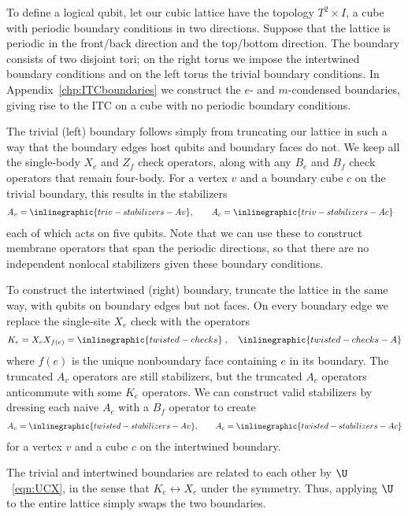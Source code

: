To define a logical qubit, let our cubic lattice have the topology $T^2\times I$, a cube with periodic boundary conditions in two directions. Suppose that the lattice is periodic in the front/back direction and the top/bottom direction. The boundary consists of two disjoint tori; on the right torus we impose the intertwined boundary conditions and on the left torus the trivial boundary conditions.  
In Appendix~\ref{chp:ITCboundaries} we construct the $e$- and $m$-condensed boundaries, giving rise to the ITC on a cube with no periodic boundary conditions.

The trivial (left) boundary follows simply from truncating our lattice in such a way that the boundary edges host qubits and boundary faces do not. We keep all the single-body $X_e$ and $Z_f$ check operators, along with any $B_e$ and $B_f$ check operators that remain four-body.
For a vertex $v$ and a boundary cube $c$ on the trivial boundary, this results in the stabilizers
\begin{align}
A_v &= \inlinegraphic{triv-stabilizers-Av}, \qquad A_c = \inlinegraphic{triv-stabilizers-Ac}\label{eqn:triv-stabilizers}
\end{align}
each of which acts on five qubits. Note that we can use these to construct membrane operators that span the periodic directions, so that there are no independent nonlocal stabilizers given these boundary conditions.

To construct the intertwined (right) boundary, truncate the lattice in the same way, with qubits on boundary edges but not faces. On every boundary edge we replace the single-site $X_e$ check with the operators
\begin{align}
K_e = X_e X_{f(e)} =\inlinegraphic{twisted-checks}\;,\quad \inlinegraphic{twisted-checks-A} \label{eqn:twisted-checks}
\end{align}
where $f(e)$ is the unique nonboundary face containing $e$ in its boundary. The truncated $A_v$ operators are still stabilizers, but the truncated $A_c$ operators anticommute with some $K_e$ operators. We can construct valid stabilizers by dressing each naive $A_c$ with a $B_f$ operator to create
\begin{align}
A_v = \inlinegraphic{twisted-stabilizers-Av},  \qquad A_c = \inlinegraphic{twisted-stabilizers-Ac}\label{eqn:twisted-stabilizers}
\end{align}
for a vertex $v$ and a cube $c$ on the intertwined boundary.

The trivial and intertwined boundaries are related to each other by $\U$~\eqref{eqn:UCX}, in the sense that $K_e \leftrightarrow X_e$ under the symmetry. Thus, applying $\U$ to the entire lattice simply swaps the two boundaries.

